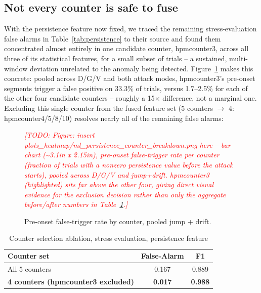 \documentclass[conference]{IEEEtran}
\newcommand{\todo}[1]{\textcolor{red}{\itshape [TODO: #1]}}
\begin{document}
\subsection{Not every counter is safe to fuse}
\label{sec:channel}

With the persistence feature now fixed, we traced the remaining stress-evaluation false alarms in Table~\ref{tab:persistence} to their source and found them concentrated almost entirely in one candidate counter, hpmcounter3, across all three of its statistical features, for a small subset of trials -- a sustained, multi-window deviation unrelated to the anomaly being detected. Figure~\ref{fig:counterbreakdown} makes this concrete: pooled across D/G/V and both attack modes, hpmcounter3's pre-onset segments trigger a false positive on 33.3\% of trials, versus 1.7--2.5\% for each of the other four candidate counters -- roughly a 15$\times$ difference, not a marginal one. Excluding this single counter from the fused feature set (5 counters $\rightarrow$ 4: hpmcounter4/5/8/10) resolves nearly all of the remaining false alarms:

\begin{figure}[htbp]
\centering
\todo{Figure: insert plots\_heatmap/ml\_persistence\_counter\_breakdown.png here -- bar chart (\textasciitilde3.1in x 2.15in), pre-onset false-trigger rate per counter (fraction of trials with a nonzero persistence value before the attack starts), pooled across D/G/V and jump+drift. hpmcounter3 (highlighted) sits far above the other four, giving direct visual evidence for the exclusion decision rather than only the aggregate before/after numbers in Table~\ref{tab:channel}.}
\caption{Pre-onset false-trigger rate by counter, pooled jump + drift.}
\label{fig:counterbreakdown}
\end{figure}

\begin{table}[htbp]
\centering
\caption{Counter selection ablation, stress evaluation, persistence feature}
\label{tab:channel}
\begin{tabular}{@{}lcc@{}}
\toprule
Counter set & False-Alarm & F1 \\
\midrule
All 5 counters                        & 0.167 & 0.889 \\
\textbf{4 counters (hpmcounter3 excluded)} & \textbf{0.017} & \textbf{0.988} \\
\bottomrule
\end{tabular}
\end{table}
\end{document}
